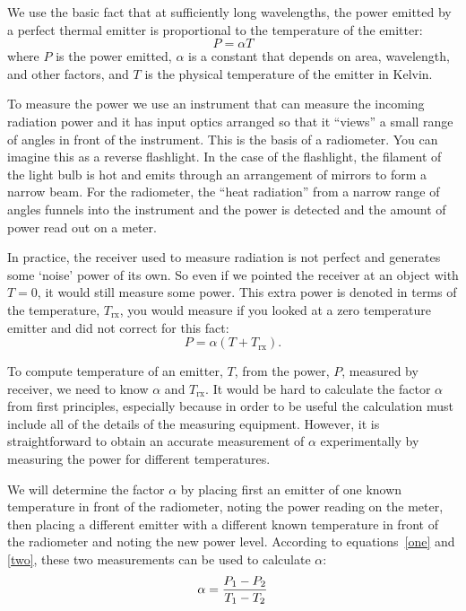 We use the basic fact that at sufficiently long wavelengths, the power emitted by a perfect thermal emitter is proportional to the temperature of the emitter:
\begin{equation}
P = \alpha T
\label{one}
\end{equation}
where $P$ is the power emitted, $\alpha$ is a constant that depends on area, wavelength, and other factors, and $T$ is the physical temperature of the emitter in Kelvin. 

To measure the power we use an instrument that can measure the incoming radiation power and it has input optics arranged so that it ``views'' a small range of angles in front of the instrument. This is the basis of a radiometer. You can imagine this as a reverse flashlight. In the case of the flashlight, the filament of the light bulb is hot and emits through an arrangement of mirrors to form a narrow beam. For the radiometer, the ``heat radiation'' from a narrow range of angles funnels into the instrument and the power is detected and the amount of power read out on a meter.

In practice, the receiver used to measure radiation is not perfect and generates some `noise' power of its own. So even if we pointed the receiver at an object with $T=0$, it would still measure some power. This extra power is denoted in terms of the temperature, $T_\textrm{rx}$, you would measure if you looked at a zero temperature emitter and did not correct for this fact:
\begin{equation}
P = \alpha (T + T_\textrm{rx}).
\label{two}
\end{equation}

To compute temperature of an emitter, $T$, from the power, $P$, measured by receiver, we need to know $\alpha$ and $T_\textrm{rx}$. 
It would be hard to calculate the factor $\alpha$ from first principles, especially because in order to be useful the calculation must include all of the details of the measuring equipment.  However, it is straightforward to obtain an accurate measurement of  $\alpha$ experimentally by measuring the power for different temperatures.

We will determine the factor $\alpha$ by placing first an emitter of one known temperature in front of the radiometer, noting the power reading on the meter, then placing a different emitter with a different known temperature in front of the radiometer and noting the new power level. According to equations~\ref{one} and \ref{two}, these two measurements can be used to calculate $\alpha$:
\begin{equation}
\alpha = {P_1 - P_2 \over T_1 - T_2}
\label{three}
\end{equation}

